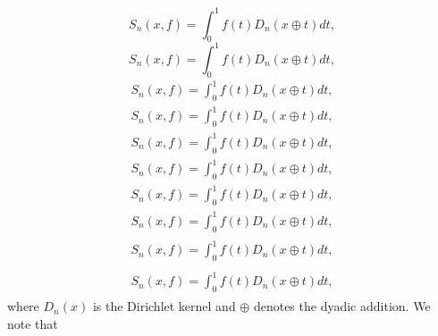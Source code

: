 \documentclass{amsart}
\numberwithin{equation}{section}
\begin{document}
{
\begin{equation*} 
S_n(x,f)=\int_0^1f(t)D_n(x\oplus t)dt,
 \end{equation*}\fi  
{}\begin{equation}
S_n(x,f)=\int_0^1f(t)D_n(x\oplus t)dt,
\end{equation}\fi   
{}\begin{align*}
S_n(x,f)=\int_0^1f(t)D_n(x\oplus t)dt,
\end{align*}\fi   
{}\begin{align}
S_n(x,f)=\int_0^1f(t)D_n(x\oplus t)dt,
\end{align}\fi    
{}\begin{gather*}
S_n(x,f)=\int_0^1f(t)D_n(x\oplus t)dt,
\end{gather*}\fi  
{}\begin{gather}
S_n(x,f)=\int_0^1f(t)D_n(x\oplus t)dt,
\end{gather}\fi   
{}\begin{multline*}
S_n(x,f)=\int_0^1f(t)D_n(x\oplus t)dt,
\end{multline*}\fi  
{}\begin{multline}
S_n(x,f)=\int_0^1f(t)D_n(x\oplus t)dt,
\end{multline}\fi  
{}\begin{multline*}\begin{split}
S_n(x,f)=\int_0^1f(t)D_n(x\oplus t)dt,
\end{split}\end{multline*}\fi
{}\begin{multline}\begin{split}
S_n(x,f)=\int_0^1f(t)D_n(x\oplus t)dt,
\end{split}\end{multline}\fi
}
where $D_n(x)$ is the Dirichlet kernel and $\oplus$ denotes the dyadic addition. We note that
\end{document}

